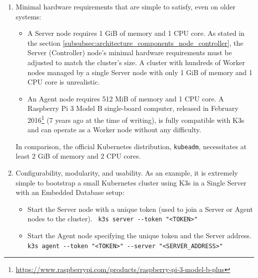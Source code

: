 \begin{enumerate}
  \item Minimal hardware requirements that are simple to satisfy, even on older
    systems\cite{k3s_hardware}:
    \begin{itemize}
      \item A Server node requires 1 GiB of memory and 1 CPU core.
        \newline
        As stated in the section
        \ref{subsubsec:architecture_components_node_controller}, the Server (Controller)
        node's minimal hardware requirements must be adjusted to match the cluster's
        size. A cluster with hundreds of Worker nodes managed by a single Server
        node with only 1 GiB of memory and 1 CPU core is unrealistic.

      \item An Agent node requires 512 MiB of memory and 1 CPU core.
        \newline
        A Raspberry Pi 3 Model B single-board computer, released in February 2016\footnote{\url{https://www.raspberrypi.com/products/raspberry-pi-3-model-b-plus}}
        (7 years ago at the time of writing), is fully compatible with K3s and
        can operate as a Worker node without any difficulty.
    \end{itemize}
    In comparison, the official Kubernetes distribution, \texttt{kubeadm},
    necessitates at least 2 GiB of memory and 2 CPU cores\cite{k8s_hardware}.

  \item Configurability, modularity, and usability\cite{k3s_configuration}.
    \newline
    As an example, it is extremely simple to bootstrap a small Kubernetes
    cluster using K3s in a Single Server with an Embedded Database setup:
    \begin{itemize}
      \item Start the Server node with a unique token (used to join a Server or
        Agent nodes to the cluster).
        \newline
        \lstinline[language=shell, alsoletter={-}, morekeywords={[2]{k3s}}, morekeywords={[3]{--token}},
        morekeywords={[4]{server}}, xleftmargin=\parindent]{ k3s server --token "<TOKEN>"}

      \item Start the Agent node specifying the unique token and the Server address.
        \newline
        \lstinline[language=shell, alsoletter={-}, morekeywords={[2]{k3s}}, morekeywords={[3]{--token, --server}},
        morekeywords={[4]{agent}}, xleftmargin=\parindent]{ k3s agent --token "<TOKEN>" --server "<SERVER_ADDRESS>"}
    \end{itemize}


\end{enumerate}
